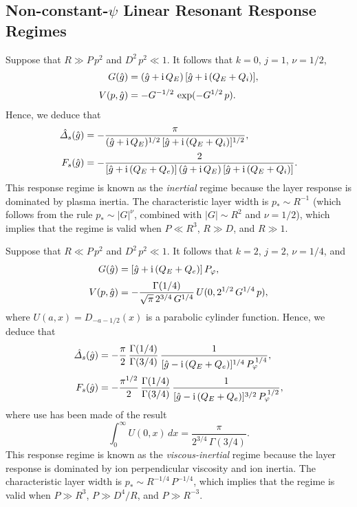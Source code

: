 \documentclass[12pt,prb,aps]{revtex4-1}
\begin{document}
\subsection{Non-constant-$\psi$ Linear Resonant Response Regimes}\label{snonc}
Suppose that $R\gg P\,p^2$ and $D^2\,p^2 \ll 1$. It follows that $k=0$, $j=1$, $\nu=1/2$, 
\begin{align}
G(\hat{g}) &= (\hat{g}+{\rm i}\,Q_E)\,[\hat{g}+{\rm i}\,(Q_E+Q_i)],\\[0.5ex]
V(p,\hat{g})&= -G^{-1/2}\,\exp(-G^{1/2}\,p).
\end{align}
Hence, we deduce that
\begin{align}\label{eia}
\hat{\mit\Delta}_s(\hat{g}) &= -\frac{\pi}{(\hat{g}+{\rm i}\,Q_E)^{1/2}\,[\hat{g}+{\rm i}\,(Q_E+Q_i)]^{1/2}},\\[0.5ex]
F_s(\hat{g})&= - \frac{2}{[\hat{g}+{\rm i}\,(Q_E+Q_e)]\,(\hat{g}+{\rm i}\,Q_E)\,[\hat{g}+{\rm i}\,(Q_E+Q_i)]}.\label{eib}
\end{align}
This response regime is known as the {\em inertial}\/ regime because the layer response is dominated by
 plasma inertia.\cite{ara,err1a} The characteristic layer width is $p_\ast \sim R^{-1}$ (which follows from the rule $p_\ast\sim |G|^\nu$, combined with $|G|\sim R^2$ and $\nu=1/2$),
which implies that the regime is valid when $P\ll R^3$, $R\gg D$, and $R\gg 1$. 

Suppose that $R\ll P\,p^2$ and $D^2\,p^2 \ll 1$. It follows that $k=2$, $j=2$, $\nu=1/4$, and
\begin{align}
G(\hat{g}) &= [\hat{g}+{\rm i}\,(Q_E+Q_e)]\,P_\varphi,\\[0.5ex]
V(p,\hat{g})&= - \frac{\Gamma(1/4)}{\sqrt{\pi}\,2^{3/4}\,G^{1/4}}\,U(0,2^{1/2}\,G^{1/4}\,p),
\end{align}
where $U(a,x)=D_{-a-1/2}(x)$ is a parabolic cylinder function.\cite{abram}
Hence, we deduce that
\begin{align}\label{evia}
\hat{\mit\Delta}_s(\hat{g}) &=- \frac{\pi}{2}\,\frac{\Gamma(1/4)}{\Gamma(3/4)}\,\frac{1}{[\hat{g}-{\rm i}\,(Q_E+Q_e)]^{1/4}\,P_\varphi^{\,1/4}},\\[0.5ex]
F_s(\hat{g}) &= - \frac{\pi^{1/2}}{2}\,\frac{\Gamma(1/4)}{\Gamma(3/4)}\,\frac{1}{[\hat{g}-{\rm i}\,(Q_E+Q_e)]^{3/2}\,P_\varphi^{\,1/2}},\label{evib}
\end{align}
where use has been made of the result
\begin{equation}
\int_0^\infty U(0,x)\,dx= \frac{\pi}{2^{3/4}\,\Gamma(3/4)}.
\end{equation}
This response regime is known as the {\em viscous-inertial}\/ regime because the layer response is dominated by
ion perpendicular viscosity and ion inertia.\cite{err1a} 
 The characteristic layer width is $p_\ast \sim R^{-1/4}\,P^{-1/4}$,
which implies that the regime is valid when $P\gg R^3$, $P\gg D^4/R$, and $P\gg R^{-3}$. 
\end{document}
